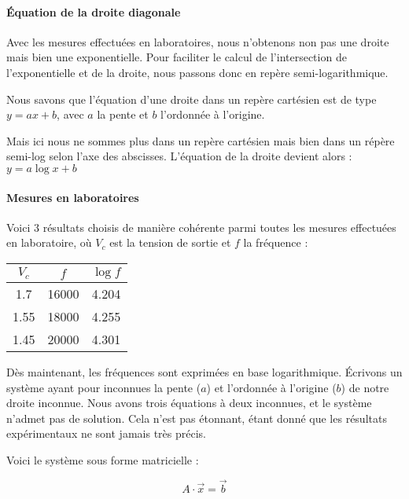\paragraph{Équation de la droite diagonale}

Avec les mesures effectuées en laboratoires, nous n'obtenons non pas une droite mais bien une exponentielle. 
Pour faciliter le calcul de l'intersection de l'exponentielle et de la droite, nous passons donc en repère 
semi-logarithmique. 

Nous savons que l'équation d'une droite dans un repère cartésien est de type $y=ax+b$, avec $a$ la pente 
et $b$ l'ordonnée à l'origine.

Mais ici nous ne sommes plus dans un repère cartésien mais bien dans un répère semi-log selon l'axe des 
abscisses. L'équation de la droite devient alors : $y=a\log{x}+b$

\paragraph{Mesures en laboratoires}

Voici 3 résultats choisis de manière cohérente parmi toutes les mesures effectuées en laboratoire, où 
$V_c$ est la tension de sortie et $f$ la fréquence :

\begin{center}
\begin{tabular}{|c|c|c|}
\hline
$V_c$ & $f$ & $\log{f}$ \\
\hline
1.7 & 16000 & 4.204 \\
\hline
1.55 & 18000 & 4.255 \\
\hline
1.45 & 20000 & 4.301 \\
\hline
\end{tabular}
\end{center}

Dès maintenant, les fréquences sont exprimées en base logarithmique.
Écrivons un système ayant pour inconnues la pente ($a$) et l'ordonnée à l'origine ($b$) de notre droite 
inconnue.
Nous avons trois équations à deux inconnues, et le système n'admet pas de solution.
Cela n'est pas étonnant, étant donné que les résultats expérimentaux ne sont jamais très précis.

Voici le système sous forme matricielle :

$$A \cdot \vec{x} = \vec{b}$$

